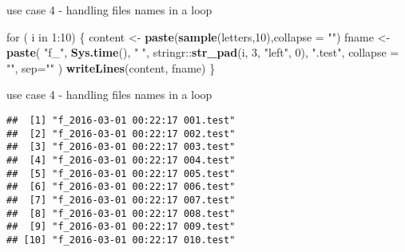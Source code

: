 \documentclass[ignorenonframetext,]{beamer}
\newenvironment{Shaded}{\begin{snugshade}}{\end{snugshade}}
\newcommand{\KeywordTok}[1]{\textcolor[rgb]{0.13,0.29,0.53}{\textbf{{#1}}}}
\newcommand{\DataTypeTok}[1]{\textcolor[rgb]{0.13,0.29,0.53}{{#1}}}
\newcommand{\DecValTok}[1]{\textcolor[rgb]{0.00,0.00,0.81}{{#1}}}
\newcommand{\CharTok}[1]{\textcolor[rgb]{0.31,0.60,0.02}{{#1}}}
\newcommand{\StringTok}[1]{\textcolor[rgb]{0.31,0.60,0.02}{{#1}}}
\newcommand{\NormalTok}[1]{{#1}}
\begin{document}
\begin{frame}[fragile]{use case 4 - handling files names in a loop}

\begin{Shaded}
\begin{Highlighting}[]
\NormalTok{for ( i in }\DecValTok{1}\NormalTok{:}\DecValTok{10}\NormalTok{) \{}
  \NormalTok{content <-}\StringTok{ }\KeywordTok{paste}\NormalTok{(}\KeywordTok{sample}\NormalTok{(letters,}\DecValTok{10}\NormalTok{),}\DataTypeTok{collapse =} \StringTok{""}\NormalTok{)}
  \NormalTok{fname   <-}\StringTok{ }
\StringTok{    }\KeywordTok{paste}\NormalTok{(}
      \StringTok{"f_"}\NormalTok{, }
      \KeywordTok{Sys.time}\NormalTok{(), }\StringTok{" "}\NormalTok{, }
      \NormalTok{stringr::}\KeywordTok{str_pad}\NormalTok{(i, }\DecValTok{3}\NormalTok{, }\StringTok{"left"}\NormalTok{, }\DecValTok{0}\NormalTok{),  }
      \StringTok{".test"}\NormalTok{,}
      \DataTypeTok{collapse =} \StringTok{""}\NormalTok{, }\DataTypeTok{sep=}\StringTok{""}
    \NormalTok{)}
  \KeywordTok{writeLines}\NormalTok{(content, fname)}
\NormalTok{\}}
\end{Highlighting}
\end{Shaded}

\end{frame}

\begin{frame}[fragile]{use case 4 - handling files names in a loop}

\begin{Shaded}
\end{Shaded}

\begin{verbatim}
##  [1] "f_2016-03-01 00:22:17 001.test"
##  [2] "f_2016-03-01 00:22:17 002.test"
##  [3] "f_2016-03-01 00:22:17 003.test"
##  [4] "f_2016-03-01 00:22:17 004.test"
##  [5] "f_2016-03-01 00:22:17 005.test"
##  [6] "f_2016-03-01 00:22:17 006.test"
##  [7] "f_2016-03-01 00:22:17 007.test"
##  [8] "f_2016-03-01 00:22:17 008.test"
##  [9] "f_2016-03-01 00:22:17 009.test"
## [10] "f_2016-03-01 00:22:17 010.test"
\end{verbatim}

\end{frame}
\end{document}
